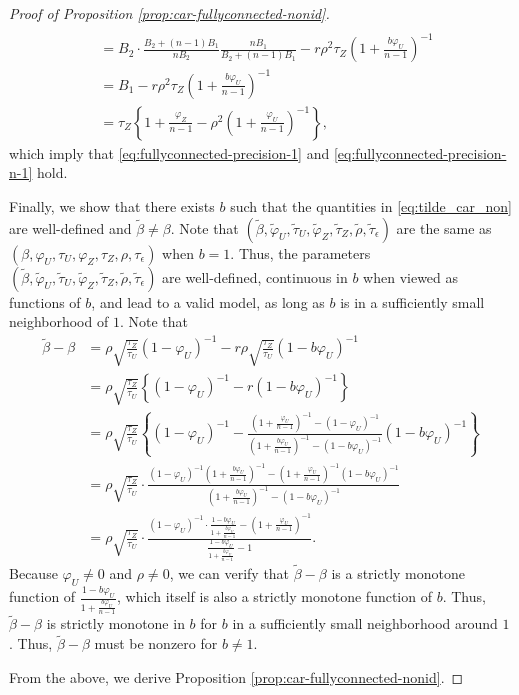 \documentclass[10pt,a4paper]{amsart}
\begin{document}
\begin{proof}[Proof of Proposition \ref{prop:car-fullyconnected-nonid}]
\begin{align*}
\\
&= 
B_2 \cdot \frac{B_2+(n-1)B_1}{nB_2}
\frac{n B_1}{B_2 + (n-1)B_1} - r\rho^2\tau_Z \left(1+\frac{b\varphi_U}{n-1}\right)^{-1}
\\ &= B_1 - r\rho^2\tau_Z \left(1+\frac{b\varphi_U}{n-1}\right)^{-1}
\\
& = \tau_Z\left\{1+\frac{\varphi_Z}{n-1} - \rho^2 \left(1+ \frac{\varphi_U}{n-1}\right)^{-1} \right\}, 
\end{align*} 
which imply that \eqref{eq:fullyconnected-precision-1}
and \eqref{eq:fullyconnected-precision-n-1} hold. 


Finally, we show that there exists $b$ such that the quantities in \eqref{eq:tilde_car_non} are well-defined and $\tilde\beta \ne \beta$. 
Note that $(\tilde\beta, \tilde\varphi_U, \tilde\tau_U, \tilde\varphi_Z, \tilde\tau_Z, \tilde\rho, \tilde\tau_\epsilon)$ are the same as $(\beta, \varphi_U, \tau_U, \varphi_Z, \tau_Z, \rho, \tau_\epsilon)$ when $b=1$. 
Thus, the parameters $(\tilde\beta, \tilde\varphi_U, \tilde\tau_U, \tilde\varphi_Z, \tilde\tau_Z, \tilde\rho, \tilde\tau_\epsilon)$ are well-defined, continuous in $b$ when viewed as functions of $b$, and lead to a valid model, as long as $b$ is in a sufficiently small neighborhood of $1$. 
Note that 
\begin{align*}
    \tilde\beta - \beta & = 
    \rho\sqrt{\frac{\tau_Z}{\tau_U}}(1-\varphi_U)^{-1} - r\rho\sqrt{\frac{\tau_Z}{\tau_U}}(1-b\varphi_U)^{-1}
    \\ &= 
    \rho\sqrt{\frac{\tau_Z}{\tau_U}} 
    \left\{ (1-\varphi_U)^{-1}  - r (1-b\varphi_U)^{-1}\right\}\\
    & = 
    \rho\sqrt{\frac{\tau_Z}{\tau_U}} 
    \left\{ (1-\varphi_U)^{-1}  - \frac{\left(1 + \frac{\varphi_U}{n-1} \right)^{-1} - \left(1-\varphi_U\right)^{-1}}{\left(1 + \frac{b\varphi_U}{n-1} \right)^{-1} - \left(1-b\varphi_U\right)^{-1}}  (1-b\varphi_U)^{-1}\right\}\\
    & = \rho\sqrt{\frac{\tau_Z}{\tau_U}} \cdot
    \frac{
    (1-\varphi_U)^{-1}\left(1 + \frac{b\varphi_U}{n-1} \right)^{-1} - \left(1 + \frac{\varphi_U}{n-1} \right)^{-1} (1-b\varphi_U)^{-1}
    }{\left(1 + \frac{b\varphi_U}{n-1} \right)^{-1} - \left(1-b\varphi_U\right)^{-1}}\\
    & = 
    \rho\sqrt{\frac{\tau_Z}{\tau_U}} \cdot
    \frac{
    (1-\varphi_U)^{-1} \cdot
    \frac{1-b\varphi_U}{ 1 + \frac{b\varphi_U}{n-1} }
     - \left(1 + \frac{\varphi_U}{n-1} \right)^{-1} 
    }{\frac{1-b\varphi_U}{ 1 + \frac{b\varphi_U}{n-1} } - 1}.
\end{align*}
Because $\varphi_U \ne 0$ and $\rho \ne 0$, we can verify that $ \tilde\beta - \beta$ is a strictly monotone function of $\frac{1-b\varphi_U}{ 1 + \frac{b\varphi_U}{n-1} }$, which itself is also a strictly monotone function of $b$. 
Thus, $\tilde\beta - \beta$ is strictly monotone in $b$ for $b$ in a sufficiently small neighborhood around $1$. 
Thus, $\tilde\beta - \beta$ must be nonzero for $b\ne 1$. 


From the above, we derive Proposition \ref{prop:car-fullyconnected-nonid}. 
\end{proof}
\end{document}

